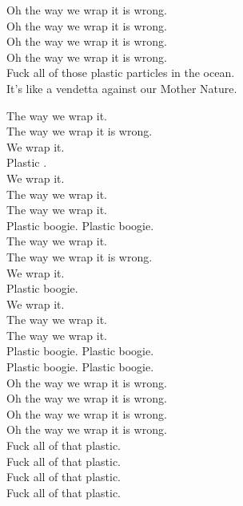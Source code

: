 Oh the way we wrap it is wrong. \\
Oh the way we wrap it is wrong. \\
Oh the way we wrap it is wrong. \\
Oh the way we wrap it is wrong. \\

Fuck all of those plastic particles in the ocean. \\
It's like a vendetta against our Mother Nature.

The way we wrap it. \\
The way we wrap it is wrong. \\
We wrap it. \\
Plastic . \\
We wrap it. \\
The way we wrap it. \\
The way we wrap it. \\

Plastic boogie. Plastic boogie. \\

The way we wrap it. \\
The way we wrap it is wrong. \\
We wrap it. \\
Plastic boogie. \\
We wrap it. \\The way we wrap it. \\
The way we wrap it. \\

Plastic boogie. Plastic boogie. \\
Plastic boogie. Plastic boogie. \\

Oh the way we wrap it is wrong. \\
Oh the way we wrap it is wrong. \\
Oh the way we wrap it is wrong. \\
Oh the way we wrap it is wrong. \\

Fuck all of that plastic. \\
Fuck all of that plastic. \\
Fuck all of that plastic. \\
Fuck all of that plastic. \\



